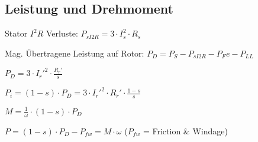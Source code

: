 \documentclass[german]{latex4ei/latex4ei_sheet}
\begin{document}
\begin{sectionbox}
				\subsection{Leistung und Drehmoment}
						\item Stator $I^2R$ Verluste: $P_{sI2R} = 3\cdot I_s^2\cdot R_s$
						\item Mag. Übertragene Leistung auf Rotor: $P_D = P_S-P_{sI2R}-P_Fe-P_{LL}$
						\item $P_D = 3\cdot I_r'^2\cdot \frac{R_r'}{s}$
						\item $P_i = (1-s)\cdot P_D = 3\cdot I_r'^2\cdot R_r'\cdot \frac{1-s}{s}$
						\item $M = \frac{1}{\omega}\cdot (1-s)\cdot P_D$
						\item $P = (1-s)\cdot P_D-P_{fw} = M\cdot \omega$ ($P_{fw}$ = Friction \& Windage)
	\end{sectionbox}
\end{document}
